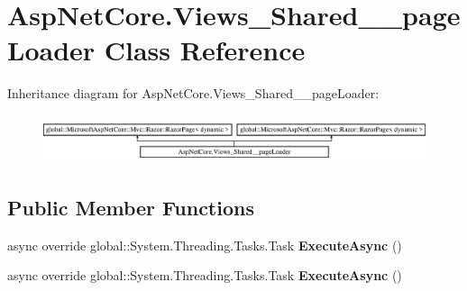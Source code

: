 \hypertarget{class_asp_net_core_1_1_views___shared____page_loader}{}\section{Asp\+Net\+Core.\+Views\+\_\+\+Shared\+\_\+\+\_\+page\+Loader Class Reference}
\label{class_asp_net_core_1_1_views___shared____page_loader}
Inheritance diagram for Asp\+Net\+Core.\+Views\+\_\+\+Shared\+\_\+\+\_\+page\+Loader\+:\begin{figure}[H]
\begin{center}
\leavevmode
\includegraphics[height=1.432225cm]{class_asp_net_core_1_1_views___shared____page_loader}
\end{center}
\end{figure}
\subsection*{Public Member Functions}
\begin{DoxyCompactItemize}
\item 
\mbox{\label{class_asp_net_core_1_1_views___shared____page_loader_a5969b62e256c9009f3a36afedc075d47}} 
async override global\+::\+System.\+Threading.\+Tasks.\+Task {\bfseries Execute\+Async} ()
\item 
\mbox{\label{class_asp_net_core_1_1_views___shared____page_loader_a5969b62e256c9009f3a36afedc075d47}} 
async override global\+::\+System.\+Threading.\+Tasks.\+Task {\bfseries Execute\+Async} ()
\end{DoxyCompactItemize}
